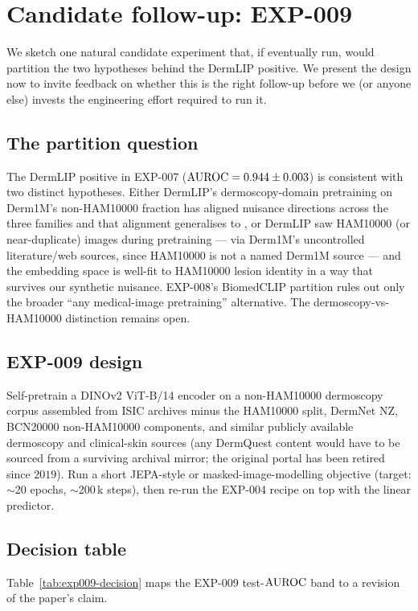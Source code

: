 \section{Candidate follow-up: EXP-009}
\label{sec:followup}

We sketch one natural candidate experiment that, if eventually run,
would partition the two hypotheses behind the DermLIP positive. We
present the design now to invite feedback on whether this is the right
follow-up before we (or anyone else) invests the engineering effort
required to run it.

\subsection{The partition question}
The DermLIP positive in EXP-007 ($\mathrm{AUROC} = 0.944 \pm 0.003$) is consistent
with two distinct hypotheses. Either DermLIP's dermoscopy-domain pretraining
on Derm1M's non-HAM10000 fraction has aligned nuisance directions across the
three families and that alignment generalises to \strongholdtwo, or DermLIP
saw HAM10000 (or near-duplicate) images during pretraining --- via Derm1M's
uncontrolled literature/web sources, since HAM10000 is not a named Derm1M
source --- and the embedding space is well-fit to HAM10000 lesion identity in
a way that survives our synthetic nuisance. EXP-008's BiomedCLIP partition rules out only the broader ``any
medical-image pretraining'' alternative. The dermoscopy-vs-HAM10000
distinction remains open.

\subsection{EXP-009 design}
Self-pretrain a DINOv2 ViT-B/14 encoder on a non-HAM10000 dermoscopy
corpus assembled from ISIC archives minus the HAM10000 split, DermNet
NZ, BCN20000 \citep{combalia2019bcn20000} non-HAM10000 components, and
similar publicly available dermoscopy and clinical-skin sources
(any DermQuest content would have to be sourced from a surviving
archival mirror; the original portal has been retired since $2019$). Run a short
JEPA-style or masked-image-modelling objective (target: $\sim$20 epochs,
$\sim$200\,k steps), then re-run the EXP-004 recipe on top with the linear
predictor.

\subsection{Decision table}
Table~\ref{tab:exp009-decision} maps the EXP-009 test-$\mathrm{AUROC}$ band to a
revision of the paper's claim.

